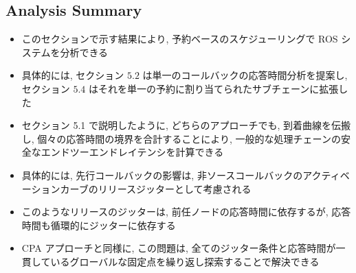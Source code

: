 \subsection{Analysis Summary}
\label{ssec: analysis summary}

\begin{frame}{}
    \begin{itemize}
        \item このセクションで示す結果により, 予約ベースのスケジューリングで ROS システムを分析できる
\item 具体的には, セクション $5.2$ は単一のコールバックの応答時間分析を提案し, セクション $5.4$ はそれを単一の予約に割り当てられたサブチェーンに拡張した
\item セクション 5.1 で説明したように, どちらのアプローチでも, 到着曲線を伝搬し, 個々の応答時間の境界を合計することにより, 一般的な処理チェーンの安全なエンドツーエンドレイテンシを計算できる
\item 具体的には, 先行コールバックの影響は, 非ソースコールバックのアクティベーションカーブのリリースジッターとして考慮される
\item このようなリリースのジッターは, 前任ノードの応答時間に依存するが, 応答時間も循環的にジッターに依存する
\item CPA アプローチと同様に, この問題は, 全てのジッター条件と応答時間が一貫しているグローバルな固定点を繰り返し探索することで解決できる
    \end{itemize}
\end{frame}
